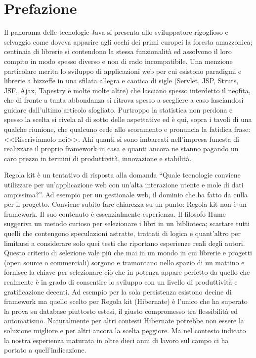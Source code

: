 \chapter*{Prefazione}

Il panorama delle tecnologie Java si presenta allo sviluppatore rigoglioso e selvaggio come doveva apparire agli occhi dei primi europei la foresta amazzonica; centinaia di librerie si contendono la stessa funzionalità ed assolvono il loro compito in modo spesso diverso e non di rado incompatibile. Una menzione particolare merita lo sviluppo di applicazioni web per cui esistono paradigmi e librerie a bizzeffe in una sfilata allegra e caotica di sigle (Servlet, JSP, Struts, JSF, Ajax, Tapestry e molte molte altre) che lasciano spesso interdetto il neofita, che di fronte a tanta abbondanza si ritrova spesso a scegliere a caso lasciandosi guidare dall'ultimo articolo sfogliato. Purtroppo la statistica non perdona e spesso la scelta si rivela al di sotto delle aspettative ed è qui, sopra i tavoli di una qualche riunione, che qualcuno cede allo scoramento e pronuncia la fatidica frase: <<Riscriviamolo noi>>. Ahi quanti si sono imbarcati nell'impresa funesta di realizzare il proprio framework in casa e quanti ancora ne stanno pagando un caro prezzo in termini di produttività, innovazione e stabilità.

Regola kit è un tentativo di risposta alla domanda “Quale tecnologie conviene utilizzare per un'applicazione web con un'alta interazione utente e mole di dati ampissima?”. Ad esempio per un gestionale web, il dominio che ha fatto da culla per il progetto. Conviene subito fare chiarezza su un punto: Regola kit non è un framework. Il suo contenuto è essenzialmente esperienza. Il filosofo Hume suggeriva un metodo curioso per selezionare i libri in un biblioteca; scartare tutti quelli che contengono speculazioni astratte, trattati di logica e quant'altro per limitarsi a considerare solo quei testi che riportano esperienze reali degli autori. Questo criterio di selezione vale più che mai in un mondo in cui librerie e progetti (open source o commerciali) sorgono e tramontano nello spazio di un mattino e fornisce la chiave per selezionare ciò che in potenza appare perfetto da quello che realmente è in grado di consentire lo sviluppo con un livello di produttività e gratificazione decenti. Ad esempio per la sola persistenza esistono decine di framework ma quello scelto per Regola kit (Hibernate) è l'unico che ha superato la prova su database piuttosto estesi, il giusto compromesso tra flessibilità ed automatismo. Naturalmente per altri contesti Hibernate potrebbe non essere la soluzione migliore e per altri ancora la scelta peggiore. Ma nel contesto indicato la nostra esperienza maturata in oltre dieci anni di lavoro sul campo ci ha portato a quell'indicazione.

